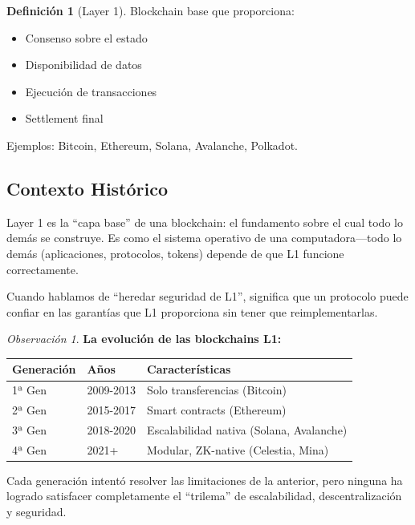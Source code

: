 \documentclass[11pt,a4paper,twoside,openright]{book}
\theoremstyle{definition}
\newtheorem{definition}{Definición}[chapter]
\theoremstyle{plain}
\theoremstyle{remark}
\newtheorem{remark}{Observación}[chapter]
\begin{document}
\begin{definition}[Layer 1]
Blockchain base que proporciona:
\begin{itemize}
    \item Consenso sobre el estado
    \item Disponibilidad de datos
    \item Ejecución de transacciones
    \item Settlement final
\end{itemize}
\end{definition}

Ejemplos: Bitcoin, Ethereum, Solana, Avalanche, Polkadot.

\subsection{Contexto Histórico}

\begin{intuicion}
Layer 1 es la ``capa base'' de una blockchain: el fundamento sobre el cual todo lo demás se construye. Es como el sistema operativo de una computadora---todo lo demás (aplicaciones, protocolos, tokens) depende de que L1 funcione correctamente.

Cuando hablamos de ``heredar seguridad de L1'', significa que un protocolo puede confiar en las garantías que L1 proporciona sin tener que reimplementarlas.
\end{intuicion}

\begin{remark}
\textbf{La evolución de las blockchains L1:}

\begin{center}
\begin{tabular}{lll}
\toprule
\textbf{Generación} & \textbf{Años} & \textbf{Características} \\
\midrule
1ª Gen & 2009-2013 & Solo transferencias (Bitcoin) \\
2ª Gen & 2015-2017 & Smart contracts (Ethereum) \\
3ª Gen & 2018-2020 & Escalabilidad nativa (Solana, Avalanche) \\
4ª Gen & 2021+ & Modular, ZK-native (Celestia, Mina) \\
\bottomrule
\end{tabular}
\end{center}

Cada generación intentó resolver las limitaciones de la anterior, pero ninguna ha logrado satisfacer completamente el ``trilema'' de escalabilidad, descentralización y seguridad.
\end{remark}
\end{document}
